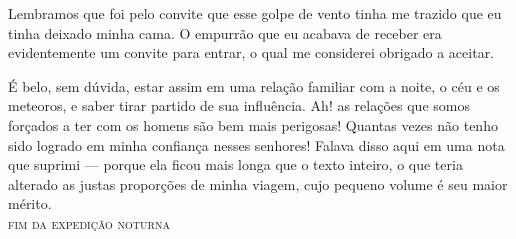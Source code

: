  Lembramos que foi pelo convite que esse golpe de vento tinha me trazido
que eu tinha deixado minha cama. O empurrão que eu acabava de receber
era evidentemente um convite para entrar, o qual me considerei obrigado
a aceitar.

 É belo, sem dúvida, estar assim em uma relação familiar com a noite, o
céu e os meteoros, e saber tirar partido de sua influência. Ah! as
relações que somos forçados a ter com os homens são bem mais perigosas!
Quantas vezes não tenho sido logrado em minha confiança nesses
senhores! Falava disso aqui em uma nota que suprimi --- porque ela
ficou mais longa que o texto inteiro, o que teria alterado as justas
proporções de minha viagem, cujo pequeno volume é seu maior mérito.
\ \\

\hfil\textsc{fim da expedição noturna}




